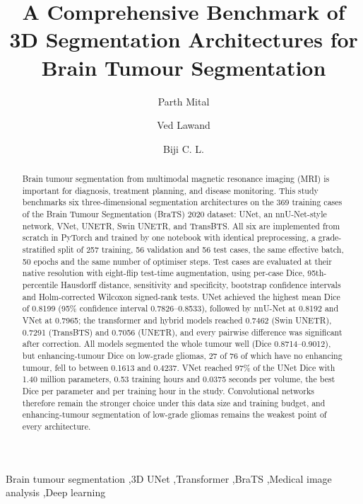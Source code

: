 \documentclass[final,3p,times,number]{elsarticle}
\begin{document}
\begin{frontmatter}

\title{A Comprehensive Benchmark of 3D Segmentation Architectures for Brain Tumour Segmentation}

\author[vit]{Parth Mital}
\author[vit]{Ved Lawand}
\author[vit]{Biji C. L.}


\begin{abstract}
Brain tumour segmentation from multimodal magnetic resonance imaging (MRI) is important for diagnosis, treatment planning, and disease monitoring. This study benchmarks six three-dimensional segmentation architectures on the 369 training cases of the Brain Tumour Segmentation (BraTS) 2020 dataset: UNet, an nnU-Net-style network, VNet, UNETR, Swin UNETR, and TransBTS. All six are implemented from scratch in PyTorch and trained by one notebook with identical preprocessing, a grade-stratified split of 257 training, 56 validation and 56 test cases, the same effective batch, 50 epochs and the same number of optimiser steps. Test cases are evaluated at their native resolution with eight-flip test-time augmentation, using per-case Dice, 95th-percentile Hausdorff distance, sensitivity and specificity, bootstrap confidence intervals and Holm-corrected Wilcoxon signed-rank tests. UNet achieved the highest mean Dice of 0.8199 (95\% confidence interval 0.7826--0.8533), followed by nnU-Net at 0.8192 and VNet at 0.7965; the transformer and hybrid models reached 0.7462 (Swin UNETR), 0.7291 (TransBTS) and 0.7056 (UNETR), and every pairwise difference was significant after correction. All models segmented the whole tumour well (Dice 0.8714--0.9012), but enhancing-tumour Dice on low-grade gliomas, 27 of 76 of which have no enhancing tumour, fell to between 0.1613 and 0.4237. VNet reached 97\% of the UNet Dice with 1.40 million parameters, 0.53 training hours and 0.0375 seconds per volume, the best Dice per parameter and per training hour in the study. Convolutional networks therefore remain the stronger choice under this data size and training budget, and enhancing-tumour segmentation of low-grade gliomas remains the weakest point of every architecture.
\end{abstract}

\begin{keyword}
Brain tumour segmentation \sep 3D UNet \sep Transformer \sep BraTS \sep Medical image analysis \sep Deep learning
\end{keyword}

\end{frontmatter}
\end{document}
